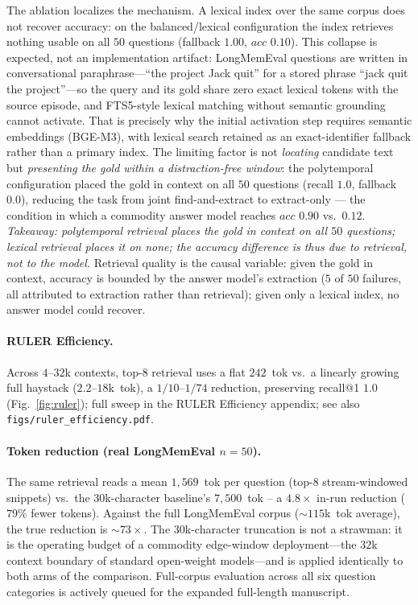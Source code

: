\documentclass[letterpaper]{article}
\begin{document}
The ablation localizes the mechanism. A lexical index over the same corpus does not recover accuracy: on the balanced/lexical configuration the index retrieves nothing usable on all $50$ questions (fallback $1.00$, $acc$ $0.10$). This collapse is expected, not an implementation artifact: LongMemEval questions are written in conversational paraphrase---``the project Jack quit'' for a stored phrase ``jack quit the project''---so the query and its gold share zero exact lexical tokens with the source episode, and FTS5-style lexical matching without semantic grounding cannot activate. That is precisely why the initial activation step requires semantic embeddings (BGE-M3), with lexical search retained as an exact-identifier fallback rather than a primary index. The limiting factor is not \emph{locating} candidate text but \emph{presenting the gold within a distraction-free window}: the polytemporal configuration placed the gold in context on all $50$ questions (recall $1.0$, fallback $0.0$), reducing the task from joint find-and-extract to extract-only --- the condition in which a commodity answer model reaches $acc$ $0.90$ vs.\ $0.12$. \emph{Takeaway: polytemporal retrieval places the gold in context on all $50$ questions; lexical retrieval places it on none; the accuracy difference is thus due to retrieval, not to the model.} Retrieval quality is the causal variable: given the gold in context, accuracy is bounded by the answer model's extraction ($5$ of $50$ failures, all attributed to extraction rather than retrieval); given only a lexical index, no answer model could recover.

\paragraph{RULER Efficiency.} Across $4$--$32$k contexts, top-$8$ retrieval uses a flat $242$~tok vs.\ a linearly growing full haystack ($2.2$--$18$k~tok), a $1/10$--$1/74$ reduction, preserving recall@1 $1.0$ (Fig.~\ref{fig:ruler}); full sweep in the RULER Efficiency appendix; see also \texttt{figs/ruler\_efficiency.pdf}.

\paragraph{Token reduction (real LongMemEval $n{=}50$).} The same retrieval reads a mean $1{,}569$~tok per question (top-8 stream-windowed snippets) vs.\ the $30$k-character baseline's $7{,}500$~tok -- a $4.8\times$ in-run reduction ($79\%$ fewer tokens). Against the full LongMemEval corpus ($\sim115$k~tok average), the true reduction is $\sim73\times$. The $30$k-character truncation is not a strawman: it is the operating budget of a commodity edge-window deployment---the $32$k context boundary of standard open-weight models---and is applied identically to both arms of the comparison. Full-corpus evaluation across all six question categories is actively queued for the expanded full-length manuscript.
\end{document}
